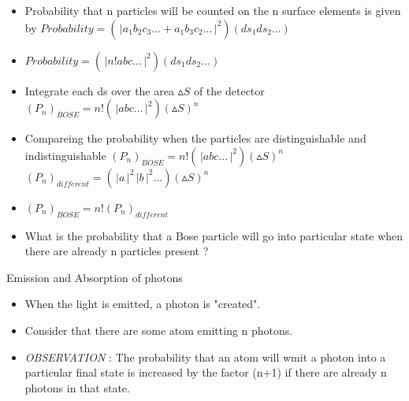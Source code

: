 \documentclass[aspectratio=169]{beamer}
\begin{document}
\begin{frame}
	\begin{itemize}
	\item Probability that n particles will be counted on the n surface elements is given by \newline $Probability = \left(\,\Bigr\rvert a_{1}b_{2}c_{3}... + a_{1}b_{3}c_{2}... \,\Bigr\rvert^{2}\right)(ds_{1}ds_{2}...)$
	\item $Probability = \left(\,\Bigr\rvert n!abc... \,\Bigr\rvert^{2}\right)(ds_{1}ds_{2}...)$
	\item Integrate each ds over the area $\vartriangle S$ of the detector \newline
	$(P_{n})_{BOSE} = n!\left(\,\Bigr\rvert abc... \,\Bigr\rvert^{2}\right)(\vartriangle S)^{n}$
	\end{itemize}
\end{frame}

\begin{frame}
	\begin{itemize}
	\item Compareing the probability when the particles are distinguishable and indistinguishable \newline
	$(P_{n})_{BOSE} = n!\left(\,\Bigr\rvert abc... \,\Bigr\rvert^{2}\right)(\vartriangle S)^{n}$ \newline
	$(P_{n})_{different} = \left(\,\Bigr\rvert a \,\Bigr\rvert^{2}\,\Bigr\rvert b \,\Bigr\rvert^{2}...\right)(\vartriangle S)^{n}$ 
	\item $(P_{n})_{BOSE} = n!(P_{n})_{different}$
	\end{itemize}
\end{frame}

\begin{frame}
	\begin{itemize}
		\item What is the probability that a Bose particle will go into particular state when there are already n particles present ?
	\end{itemize}
\end{frame}

\begin{frame}{Emission and Absorption of photons}
	\begin{itemize}
		\item When the light is emitted, a photon is "created".\newline
		\item Consider that there are some atom emitting n photons. \newline
		\item \textit{OBSERVATION} : The probability that an atom will wmit a photon into a particular final state is increased by the factor (n+1) if there are already n photons in that state.
	\end{itemize}
\end{frame}
\end{document}
